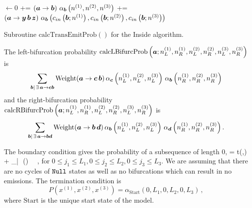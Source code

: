 \documentclass[10pt]{article}
\begin{document}
\begin{algorithm}[!ht]
  \SetLine

  \emitProb $\leftarrow 0$\;
   {
    \emitProb += \Weight$\left( \boldsymbol{a} \to \boldsymbol{b} \right)\, \alpha_{\boldsymbol{b}}\left( n^{(1)}, n^{(2)}, n^{(3)} \right)$\;
  }
   {
    \emitProb += \Weight$\left( \boldsymbol{a} \to \boldsymbol{y}\,\boldsymbol{b}\,\boldsymbol{z} \right)\, \alpha_{\boldsymbol{b}}\left( c_{in}\left(\boldsymbol{b}; n^{(1)}\right), c_{in}\left(\boldsymbol{b}; n^{(2)}\right), c_{in}\left(\boldsymbol{b}; n^{(3)}\right) \right)$\;
  }
  \KwRet{\emitProb}\;
  \caption{
    Subroutine $\mathrm{calcTransEmitProb}()$ for the Inside algorithm.
  }
\end{algorithm}

The left-bifurcation probability $\mathrm{calcLBifurcProb}\left( \boldsymbol{a}; n^{(1)}_L,n^{(1)}_R,n^{(2)}_L,n^{(2)}_R,n^{(3)}_L,n^{(3)}_R \right)$ is
\[ \sum_{\boldsymbol{b}|\,\exists\, \boldsymbol{a}\to\boldsymbol{c}\boldsymbol{b}} \operatorname{Weight} (\boldsymbol{a}\to\boldsymbol{c}\,\boldsymbol{b}) \, \alpha_{\boldsymbol{c}}\left( n^{(1)}_L,n^{(2)}_L,n^{(3)}_L\right) \, \alpha_{\boldsymbol{b}}\left( n^{(1)}_R,n^{(2)}_R,n^{(3)}_R\right) \]
and the right-bifurcation probability $\mathrm{calcRBifurcProb}\left( \boldsymbol{a}; n^{(1)}_L,n^{(1)}_R,n^{(2)}_L,n^{(2)}_R,n^{(3)}_L,n^{(3)}_R \right)$ is
\[ \sum_{\boldsymbol{b}|\,\exists\, \boldsymbol{a}\to\boldsymbol{b}\boldsymbol{d}} \operatorname{Weight} (\boldsymbol{a}\to\boldsymbol{b}\,\boldsymbol{d}) \, \alpha_{\boldsymbol{b}}\left( n^{(1)}_L,n^{(2)}_L,n^{(3)}_L\right) \, \alpha_{\boldsymbol{d}}\left( n^{(1)}_R,n^{(2)}_R,n^{(3)}_R\right) . \]

The boundary condition gives the probability of a subsequence of length 0,
\beqn \label{eqn:insidetoend}
 = t(,\Send) + \sum_{|\,\exists\, \to{}} \weight (\to{}) \,  \, ,
\eeqn
for $0 \le j_1 \le L_1, 0 \le j_2 \le L_2, 0 \le j_3 \le L_3$.
We are assuming that there are no cycles of $\mathtt{Null}$ states as well as no bifurcations which can result in no emissions.
The termination condition is 
\[ P\left(x^{(1)},x^{(2)},x^{(3)}\right) = \alpha_{\mathrm{Start}}(0,L_1,0,L_2,0,L_3) \, , \]
where $\mathrm{Start}$ is the unique start state of the model.
\end{document}
